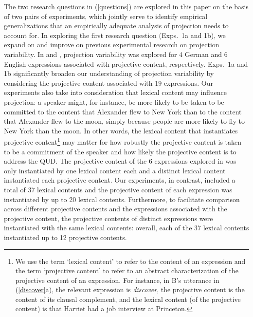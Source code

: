 \documentclass[11pt,fleqn]{article}
\newcommand{\6}{\mbox{$[\hspace*{-.6mm}[$}}
\newcommand{\9}{\mbox{$]\hspace*{-.6mm}]$}}
\begin{document}
The two research questions in (\ref{questions}) are explored in this paper on the basis of two pairs of experiments, which jointly serve to identify empirical generalizations that an empirically adequate analysis of projection needs to account for. In exploring the first research question (Exps.~1a and 1b), we expand on and improve on previous experimental research on projection variability. In \citealt{xue-onea11} and \citealt{smith-hall11}, projection variability was explored for 4 German and 6 English expressions associated with projective content, respectively. Exps.~1a and 1b significantly broaden our understanding of projection variability by considering the projective content associated with 19 expressions. Our experiments also take into consideration that lexical content may influence projection: a speaker might, for instance, be more likely to be taken to be committed to the content that Alexander flew to New York than to the content that Alexander flew to the moon, simply because people are more likely to fly to New York than the moon. In other words, the lexical content that instantiates projective content\footnote{\label{f-content}We use the term `lexical content' to refer to the content of an expression and the term `projective content' to refer to an abstract characterization of the projective content of an expression. For instance, in B's utterance in (\ref{discover}a), the relevant expression is {\em discover}, the projective content is the content of its clausal complement, and the lexical content (of the projective content) is that Harriet had a job interview at Princeton.} may matter for how robustly the projective content is taken to be a commitment of the speaker and how likely the projective content is to address the QUD. The projective content of the 6 expressions explored in \citealt{smith-hall11} was only instantiated by one lexical content each and a distinct lexical content instantiated each projective content. Our experiments, in contrast, included a total of 37 lexical contents and the projective content of each expression was instantiated by up to 20 lexical contents. Furthermore, to facilitate comparison across different projective contents and the expressions associated with the projective content, the projective contents of distinct expressions were instantiated with the same lexical contents: overall, each of the 37 lexical contents instantiated up to 12 projective contents.
\end{document}
